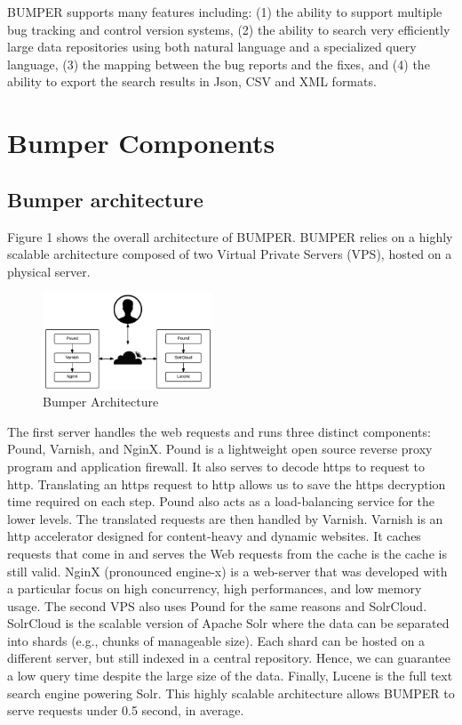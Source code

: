\documentclass[conference]{IEEEtran}
\begin{document}
BUMPER supports many features including: (1) the ability to support multiple bug tracking and control version systems, (2) the ability to search very efficiently large data repositories using both natural language and a specialized query language, (3) the mapping between the bug reports and the fixes, and (4) the ability to export the search results in Json, CSV and XML formats.

\section{Bumper Components}
\label{sec:Bumper Components}

\subsection{Bumper architecture}
\label{sub:Bumper architecture}

Figure 1 shows the overall architecture of BUMPER. BUMPER relies on a highly scalable architecture composed of two Virtual Private Servers (VPS), hosted on a physical server.

\begin{figure}
  \centering
  \includegraphics[width=0.45\textwidth]{media/archi.png}
  \caption{Bumper Architecture}
\end{figure}


The first server handles the web requests and
runs three distinct components: Pound, Varnish, and NginX.
Pound is a lightweight open source reverse proxy program
and application firewall.
It also serves to decode https to request to http.
Translating an https request to http allows us to save the https decryption time required on each step.
Pound also acts as a load-balancing service for the lower levels.
The translated requests are then handled by Varnish.
Varnish is an http accelerator designed for content-heavy and dynamic websites.
It caches requests that come in and serves the Web requests from the cache is the cache is still valid.
NginX (pronounced engine-x) is a web-server that was developed with a particular focus on high concurrency, high performances, and low memory usage.
The second VPS also uses Pound for the same reasons and SolrCloud.
SolrCloud is the scalable version of Apache Solr where the data can be separated into shards (e.g., chunks of manageable size).
Each shard can be hosted on a different server, but still indexed in a central repository.
Hence, we can guarantee a low query time despite the  large size of the data.
Finally, Lucene is the full text search engine powering Solr.
This highly scalable architecture allows BUMPER to serve requests under 0.5 second, in average.
\end{document}
